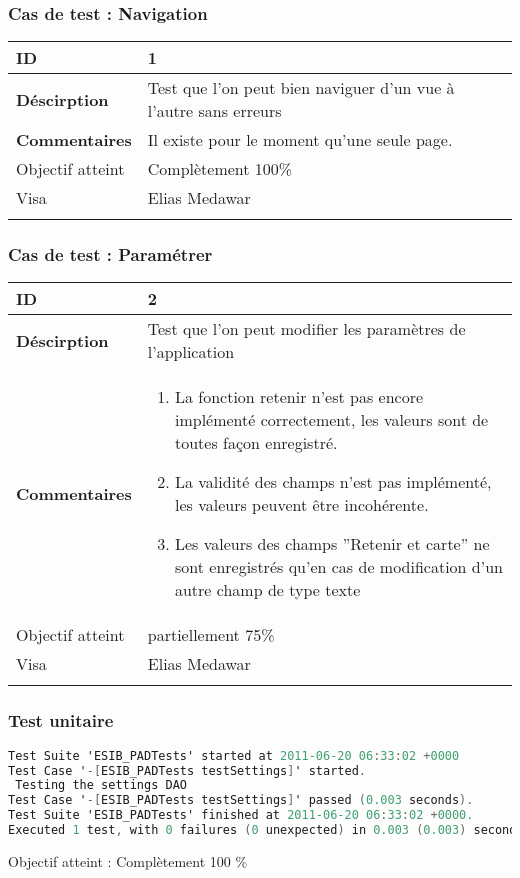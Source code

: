 		\subsubsection*{Cas de test : Navigation}
				 \begin{longtable}{m{4cm}|p{10cm}|}
				 \textbf{ ID} & 1 \\
				 \hline \textbf{Déscirption} & Test que l'on peut bien naviguer d'un vue à l'autre sans erreurs\\
				 \hline \textbf{Commentaires} &Il existe pour le moment qu'une seule page. \\
				 \hline Objectif  atteint & {\color{green} Complètement 100\% \CheckedBox } \\
				\hline Visa & Elias Medawar \\	
				 \\
			 \end{longtable} 
 		\subsubsection*{Cas de test : Paramétrer}
		 \begin{longtable}{m{4cm}|p{10cm}|}
		 \textbf{ ID} & 2 \\
		 \hline \textbf{Déscirption} & Test que l'on peut modifier les paramètres de l'application\\
		 \hline \textbf{Commentaires} & 
		 	 	 \begin{enumerate}
				  		\item La fonction retenir n'est pas encore implémenté correctement, les valeurs sont de toutes façon enregistré.
				  		\item La validité des champs n'est pas implémenté, les valeurs peuvent être incohérente.
				  		\item Les valeurs des champs ''Retenir et carte'' ne sont enregistrés qu'en cas de modification d'un autre champ de type texte
				  	\end{enumerate} \\
 				\hline Objectif atteint &  {\color{red}partiellement 75\% \XBox} \\
 				\hline Visa & Elias Medawar 	\\
		 \\
		 \end{longtable} 
		 \subsubsection*{Test unitaire}
		 \begin{lstlisting}[language=C,caption = Log des test unitaires]
Test Suite 'ESIB_PADTests' started at 2011-06-20 06:33:02 +0000
Test Case '-[ESIB_PADTests testSettings]' started.
 Testing the settings DAO
Test Case '-[ESIB_PADTests testSettings]' passed (0.003 seconds).
Test Suite 'ESIB_PADTests' finished at 2011-06-20 06:33:02 +0000.
Executed 1 test, with 0 failures (0 unexpected) in 0.003 (0.003) seconds
		 \end{lstlisting}
		Objectif atteint : {\color{green}Complètement 100 \% \CheckedBox}
